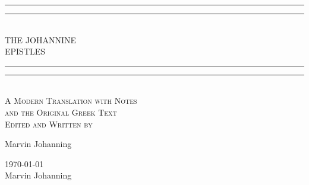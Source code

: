 \begin{doubletitle}
    \textheight
    \centering
    \vspace*{\baselineskip}
    \rule{\textwidth}{1.6pt}\vspace*{-\baselineskip}\vspace*{2pt}
    \rule{\textwidth}{0.4pt}\\[\baselineskip]
    {\LARGE THE JOHANNINE \\[0.3\baselineskip] EPISTLES }\\[0.2\baselineskip]
    \rule{\textwidth}{0.4pt}\vspace*{-\baselineskip}\vspace{3.2pt}
    \rule{\textwidth}{1.6pt}\\[\baselineskip]
    \scshape
    A Modern Translation with Notes \\
    and the Original Greek Text \\
    \vspace*{2\baselineskip}
    Edited and Written by \\[\baselineskip]
    {\Large Marvin Johanning\par}
    \vfill
    {\scshape \monthyeardate\today} \\
    {\large Marvin Johanning}\par
\end{doubletitle}